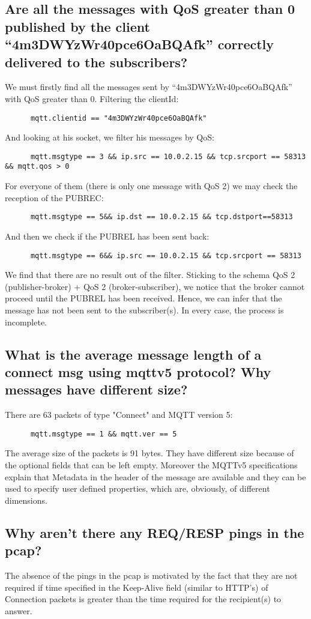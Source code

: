\documentclass[12pt]{article}
\begin{document}
    \subsection{Are all the messages with QoS greater than 0 published by the
    client “4m3DWYzWr40pce6OaBQAfk” correctly delivered
    to the subscribers?}
    We must firstly find all the messages sent by “4m3DWYzWr40pce6OaBQAfk” with QoS greater than 0.
    Filtering the clientId:
    \begin{lstlisting}
      mqtt.clientid == "4m3DWYzWr40pce6OaBQAfk"
    \end{lstlisting}
    And looking at his socket, we filter his messages by QoS:
    \begin{lstlisting}
      mqtt.msgtype == 3 && ip.src == 10.0.2.15 && tcp.srcport == 58313 && mqtt.qos > 0
    \end{lstlisting}
    For everyone of them (there is only one message with QoS 2) we may check the reception of the PUBREC:
    \begin{lstlisting}
      mqtt.msgtype == 5&& ip.dst == 10.0.2.15 && tcp.dstport==58313
    \end{lstlisting}
    And then we check if the PUBREL has been sent back:
    \begin{lstlisting}
      mqtt.msgtype == 6&& ip.src == 10.0.2.15 && tcp.srcport == 58313
    \end{lstlisting}
    We find that there are no result out of the filter. Sticking to the schema QoS 2 (publisher-broker) + QoS 2 (broker-subscriber),
    we notice that the broker cannot proceed until the PUBREL has been received. Hence, we can infer that the message has not 
    been sent to the subscriber(s).
    In every case, the process is incomplete.

    \subsection{What is the average message length of a connect msg
    using mqttv5 protocol? Why messages have different
    size?}
    There are 63 packets of type "Connect" and MQTT version 5:
    \begin{lstlisting}
      mqtt.msgtype == 1 && mqtt.ver == 5
    \end{lstlisting}
    The average size of the packets is 91 bytes. They have different size because of the 
    optional fields that can be left empty. Moreover the MQTTv5 specifications
    explain that Metadata in the header of the message are available and they can be used to 
    specify user defined properties, which are, obviously, of different dimensions. 
    \subsection{Why aren’t there any REQ/RESP pings in the pcap?}
    The absence of the pings in the pcap is motivated by the fact that they are not required if 
    time specified in the Keep-Alive field (similar to HTTP's) of Connection packets is greater than
    the time required for the recipient(s) to answer. 
\end{document}
